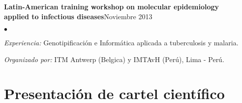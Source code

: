 \documentclass[margin,line]{res}
\newenvironment{list2}{
	\begin{list}{$\bullet$}{%
			\setlength{\itemsep}{0in}
			\setlength{\parsep}{0in} \setlength{\parskip}{0in}
			\setlength{\topsep}{0in} \setlength{\partopsep}{0in}
			\setlength{\leftmargin}{0.2in}}}{\end{list}}
\begin{document}
\begin{resume}
		
		
		
		
		{\bf Latin-American training workshop on molecular epidemiology \\applied to infectious diseases}\hfill {Noviembre 2013}\\
		\vspace*{-.1in}%
		\begin{list2} %
			\item \textit{Experiencia:} Genotipificación e Informática aplicada a tuberculosis y malaria. %
			\item \textit{Organizado por:} ITM Antwerp (Belgica) y IMTAvH (Perú), Lima - Perú.\\
		\end{list2}
		
		
		
		\section{\sc Presentación de cartel científico}
		

\end{resume}
\end{document}
